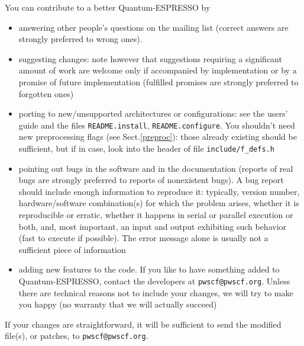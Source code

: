 \documentclass[12pt,a4paper]{article}
\makeatletter
\def\developersmail{\texttt{pwscf@pwscf.org}}
\makeatother
\begin{document}
You can contribute to a better Quantum-ESPRESSO by
\begin{itemize}
\item answering other people's questions on the mailing list
  (correct answers are strongly preferred to wrong ones).
\item 
  suggesting changes: note however that suggestions requiring a
  significant amount of work are welcome only if accompanied by
  implementation or by a promise of future implementation
  (fulfilled promises are strongly preferred to forgotten ones)
\item 
  porting to new/unsupported architectures or configurations:
  see the users' guide and the files \texttt{README.install}, 
  \texttt{README.configure}.
  You shouldn't need new preprocessing flags (see Sect.\ref{preproc}):
  those already existing should be sufficient, but if in case, 
  look into the header of file \texttt{include/f\_defs.h}
\item
  pointing out bugs in the software and in the documentation
  (reports of real bugs are strongly preferred to reports of
  nonexistent bugs). A bug report should include enough information
  to reproduce it: typically, version number, hardware/software
  combination(s) for which the problem arises, whether it is 
  reproducible or erratic, whether it happens in serial or parallel 
  execution or both, and, most important, an input and output 
  exhibiting such behavior (fast to execute if possible). The error
  message alone is usually not a sufficient piece of information
\item
  adding new features to the code. If you like to have something added
  to Quantum-ESPRESSO, contact the developers at \developersmail. 
  Unless there are technical reasons not to include your changes,
  we will try to make you happy (no warranty that we will actually succeed)
\end{itemize}
  If your changes are straightforward, it will be sufficient to send 
  the modified file(s), or patches, to \developersmail.
\end{document}
